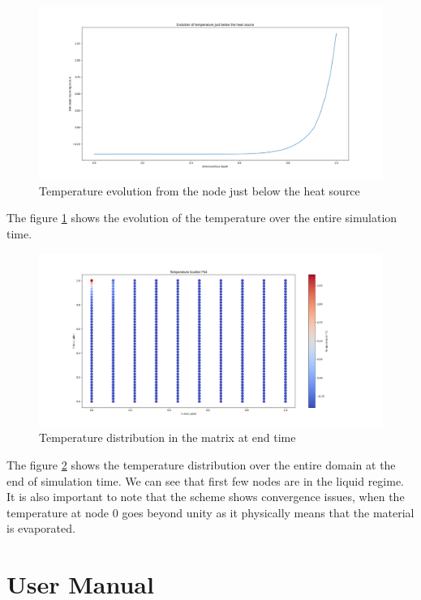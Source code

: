 \begin{figure}[h]
  \centering
  \includegraphics[width=14cm]{img/2D_Enthalpy_Temperature.png}
  \caption{Temperature evolution from the node just below the heat source}
  \label{fig:Temp just below node}
\end{figure}
The figure \ref{fig:Temp just below node} shows the evolution of the temperature over the entire simulation time.  
\begin{figure}[h]
  \centering
  \includegraphics[width=14cm]{img/Temp_2D_Dist_Enthalpy.png}
  \caption{Temperature distribution in the matrix at end time}
  \label{fig:matrix temp end time}
\end{figure}
The figure \ref{fig:matrix temp end time} shows the temperature distribution over the entire domain at the end of simulation time. We can see that first few nodes are in the liquid regime. It is also important to note that the scheme shows convergence issues, when the temperature at node 0 goes beyond unity as it physically means that the material is evaporated. 
\newpage
\chapter{User Manual}{\label{cha:Manual}}


